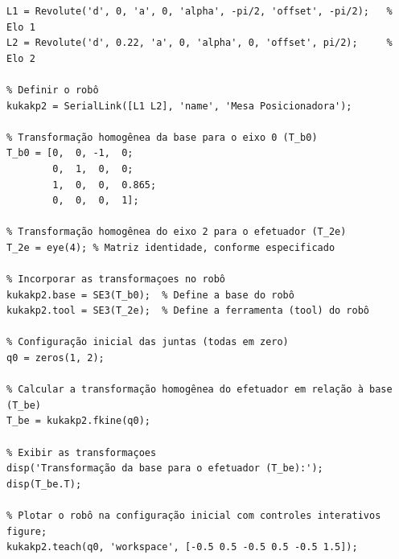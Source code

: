\documentclass[10pt]{article}
\begin{document}
\begin{lstlisting}[caption={Código da mesa poscionadora (KP2)}, label={code:kp2}]
% Parâmetros DH do robô
L1 = Revolute('d', 0, 'a', 0, 'alpha', -pi/2, 'offset', -pi/2);   % Elo 1
L2 = Revolute('d', 0.22, 'a', 0, 'alpha', 0, 'offset', pi/2);     % Elo 2

% Definir o robô
kukakp2 = SerialLink([L1 L2], 'name', 'Mesa Posicionadora');

% Transformação homogênea da base para o eixo 0 (T_b0)
T_b0 = [0,  0, -1,  0;
        0,  1,  0,  0;
        1,  0,  0,  0.865;
        0,  0,  0,  1];

% Transformação homogênea do eixo 2 para o efetuador (T_2e)
T_2e = eye(4); % Matriz identidade, conforme especificado

% Incorporar as transformaçoes no robô
kukakp2.base = SE3(T_b0);  % Define a base do robô
kukakp2.tool = SE3(T_2e);  % Define a ferramenta (tool) do robô

% Configuração inicial das juntas (todas em zero)
q0 = zeros(1, 2);

% Calcular a transformação homogênea do efetuador em relação à base (T_be)
T_be = kukakp2.fkine(q0);

% Exibir as transformaçoes
disp('Transformação da base para o efetuador (T_be):');
disp(T_be.T);

% Plotar o robô na configuração inicial com controles interativos
figure;
kukakp2.teach(q0, 'workspace', [-0.5 0.5 -0.5 0.5 -0.5 1.5]);      
\end{lstlisting}

\newpage
\end{document}
